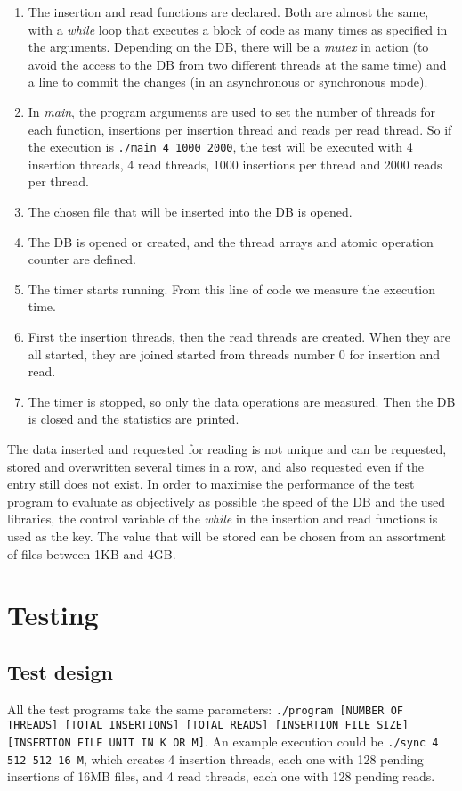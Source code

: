 \documentclass[12pt]{article}
\begin{document}
\begin{enumerate}
    \item The insertion and read functions are declared. Both are almost the same, with a \textit{while} loop that executes a block of code as many times as specified in the arguments. Depending on the DB, there will be a \textit{mutex} in action (to avoid the access to the DB from two different threads at the same time) and a line to commit the changes (in an asynchronous or synchronous mode).
    \item In \textit{main}, the program arguments are used to set the number of threads for each function, insertions per insertion thread and reads per read thread. So if the execution is \texttt{./main 4 1000 2000}, the test will be executed with 4 insertion threads, 4 read threads, 1000 insertions per thread and 2000 reads per thread.
    \item The chosen file that will be inserted into the DB is opened.
    \item The DB is opened or created, and the thread arrays and atomic operation counter are defined.
    \item The timer starts running. From this line of code we measure the execution time.
    \item First the insertion threads, then the read threads are created. When they are all started, they are joined started from threads number 0 for insertion and read.
    \item The timer is stopped, so only the data operations are measured. Then the DB is closed and the statistics are printed.
\end{enumerate}

The data inserted and requested for reading is not unique and can be requested, stored and overwritten several times in a row, and also requested even if the entry still does not exist. In order to maximise the performance of the test program to evaluate as objectively as possible the speed of the DB and the used libraries, the control variable of the \textit{while} in the insertion and read functions is used as the key. The value that will be stored can be chosen from an assortment of files between 1KB and 4GB.

\section{Testing}

\subsection{Test design}
All the test programs take the same parameters: \texttt{./program [NUMBER OF THREADS] [TOTAL INSERTIONS] [TOTAL READS] [INSERTION FILE SIZE] [INSERTION FILE UNIT IN K OR M]}. An example execution could be \texttt{./sync 4 512 512 16 M}, which creates 4 insertion threads, each one with 128 pending insertions of 16MB files, and 4 read threads, each one with 128 pending reads.
\end{document}
